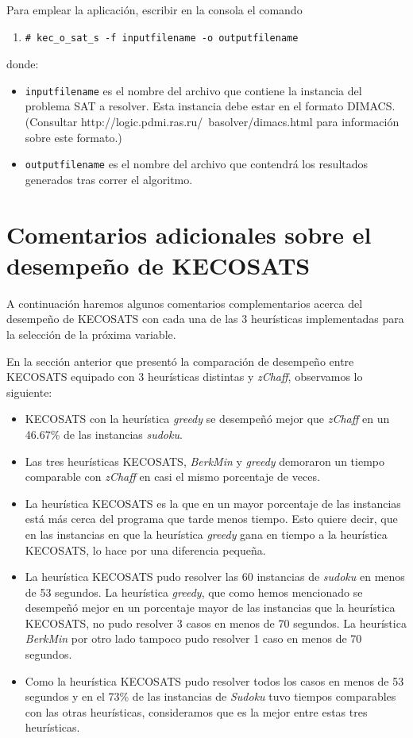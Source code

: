 \documentclass[12pt,lettersize,oneside]{article}
\begin{document}
Para emplear la aplicación, escribir en la consola el comando
\begin{enumerate}
\item \begin{lstlisting}[style=consola]
# kec_o_sat_s -f inputfilename -o outputfilename 
\end{lstlisting}
\end{enumerate}
\noindent donde:
\vspace{-2.5mm}
\begin{itemize}
\item {\tt inputfilename} es el nombre del archivo que contiene la instancia del
  problema SAT a resolver. Esta instancia debe estar en el formato DIMACS.
(Consultar http://logic.pdmi.ras.ru/~basolver/dimacs.html para información sobre
este formato.)
\item {\tt outputfilename} es el nombre del archivo que contendrá los resultados
  generados tras correr el algoritmo.
\end{itemize}


\section{Comentarios adicionales sobre el desempeño de KECOSATS}

A continuación haremos algunos comentarios complementarios acerca del desempeño
de KECOSATS con cada una de las 3 heurísticas implementadas para la selección de
la próxima variable.

 En la sección anterior que presentó la comparación de desempeño entre
  KECOSATS equipado con 3 heurísticas distintas y \emph{zChaff}, observamos
  lo siguiente:\vspace{-2.5mm}
\begin{itemize}
\item KECOSATS con la heurística \emph{greedy} se desempeñó mejor que
  \emph{zChaff} en un 46.67\% de las instancias \emph{sudoku}.
 \item Las tres heurísticas KECOSATS, \emph{BerkMin} y \emph{greedy} demoraron
   un tiempo comparable con \emph{zChaff} en casi el mismo porcentaje de veces.
\item La heurística KECOSATS es la que en un mayor porcentaje de las instancias
  está más cerca del programa que tarde menos tiempo. Esto quiere decir, que en
  las instancias en que la heurística \emph{greedy} gana en tiempo a la
  heurística KECOSATS, lo hace por una diferencia pequeña.
\item La heurística KECOSATS pudo resolver las 60 instancias de \emph{sudoku} en menos de 53 segundos. La heurística \emph{greedy}, que como hemos mencionado se desempeñó mejor en un porcentaje mayor de las instancias que la heurística KECOSATS, no pudo resolver 3 casos en menos de 70 segundos. La heurística \emph{BerkMin} por otro lado tampoco pudo resolver 1 caso en menos de 70 segundos.
\item Como la heurística KECOSATS pudo resolver todos los casos en menos de 53 segundos y en el 73\% de las instancias de \emph{Sudoku} tuvo tiempos comparables con las otras heurísticas, consideramos que es la mejor entre estas tres heurísticas.
\end{itemize}
\end{document}
